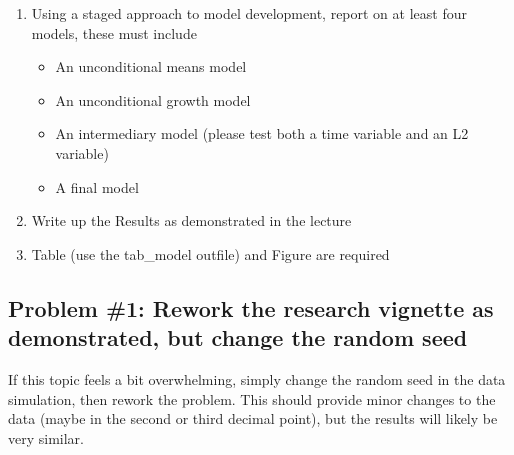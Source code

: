 \documentclass[
  11pt,
]{book}
\providecommand{\tightlist}{%
  \setlength{\itemsep}{0pt}\setlength{\parskip}{0pt}}
\begin{document}
\begin{enumerate}
\def\labelenumi{\arabic{enumi}.}
\setcounter{enumi}{2}
\tightlist
\item
  Using a staged approach to model development, report on at least four models, these must include

  \begin{itemize}
  \tightlist
  \item
    An unconditional means model
  \item
    An unconditional growth model
  \item
    An intermediary model (please test both a time variable and an L2 variable)
  \item
    A final model
  \end{itemize}
\item
  Write up the Results as demonstrated in the lecture
\item
  Table (use the tab\_model outfile) and Figure are required
\end{enumerate}

\hypertarget{problem-1-rework-the-research-vignette-as-demonstrated-but-change-the-random-seed-1}{%
\subsection{Problem \#1: Rework the research vignette as demonstrated, but change the random seed}\label{problem-1-rework-the-research-vignette-as-demonstrated-but-change-the-random-seed-1}}

If this topic feels a bit overwhelming, simply change the random seed in the data simulation, then rework the problem. This should provide minor changes to the data (maybe in the second or third decimal point), but the results will likely be very similar.
\end{document}
